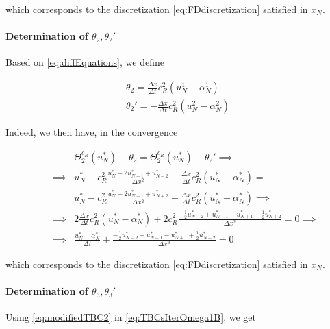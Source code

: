 \noindent which corresponds to the discretization \eqref{eq:FDdiscretization} satisfied in $x_N$. 

\paragraph{Determination of $\theta_2, \theta_2'$}

\indent Based on \eqref{eq:diffEquations}, we define

\begin{equation}
\begin{gathered}
    \theta_2 = \frac{\Delta x}{\Delta t} c_R^2 (u_N^1 - \alpha_N^1) \\
    \theta_2' = -\frac{\Delta x}{\Delta t} c_R^2 (u_N^2 - \alpha_N^2)
\end{gathered}
\end{equation}

\indent Indeed, we then have, in the convergence

\begin{equation}
\label{eq:modifiedTBC2}
\begin{aligned}
&& &\Theta_2^{c_R}(u_N^*) + \theta_2 = \Theta_2^{c_R}(u_N^*) + \theta_2'\implies \\
&& \implies & u_N^* - c_R^2 \frac{u_N^* - 2u_{N-1}^* + u_{N-2}^*}{\Delta x^2} + \frac{\Delta x}{\Delta t} c_R^2 (u_N^* - \alpha_N^*)  = \\ && & u_N^* - c_R^2 \frac{u_N^* - 2u_{N+1}^* + u_{N+2}^*}{\Delta x^2} -\frac{\Delta x}{\Delta t} c_R^2 (u_N^* - \alpha_N^*) \implies \\
&& \implies & 2\frac{\Delta x}{\Delta t} c_R^2 (u_N^* - \alpha_N^*) + 2c_R^2 \frac{-\frac{1}{2}u_{N-2}^* + u_{N-1}^* - u_{N+1}^* + \frac{1}{2}u_{N+2}^* }{\Delta x^2} = 0  \implies \\
&& \implies &\frac{u_N^* - \alpha_N^*}{\Delta t} + \frac{-\frac{1}{2}u_{N-2}^* + u_{N-1}^* - u_{N+1}^* + \frac{1}{2}u_{N+2}^* }{\Delta x^3} = 0
\end{aligned}
\end{equation}

\noindent which corresponds to the discretization \eqref{eq:FDdiscretization} satisfied in $x_N$.


\paragraph{Determination of $\theta_3, \theta_3'$}

\indent Using \eqref{eq:modifiedTBC2} in \eqref{eq:TBCsIterOmega1B}, we get

